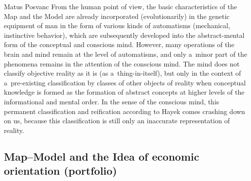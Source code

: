 \begin{artengenv}{Matus Posvanc}
From the human point of view, the basic characteristics of the Map and the Model are already incorporated (evolutionarily) in the genetic equipment of man in the form of various kinds of automatisms (mechanical, instinctive behavior), which are subsequently developed into the abstract-mental form of the conceptual and conscious mind. However, many operations of the brain and mind remain at the level of automatisms, and only a~minor part of the phenomena remains in the attention of the conscious mind. The mind does not classify objective reality as it is (as a~thing-in-itself), but only in the context of a~pre-existing classification by classes of other objects of reality when conceptual knowledge is formed as the formation of abstract concepts at higher levels of the informational and mental order. In the sense of the conscious mind, this permanent classification and reification according to Hayek 
\parencite*[][sec.6.47]{Hayek1952Sensory} %
 comes crashing down on us, because this classification is still only an inaccurate representation of reality.



\subsection*{Map–Model and the Idea of economic orientation (portfolio) }




\end{artengenv}
